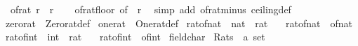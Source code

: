 \begin{isabellebody}
\ \ {\isachardoublequoteopen}{\isasymlceil}of{\isacharunderscore}{\kern0pt}rat\ r{\isasymrceil}\ {\isacharequal}{\kern0pt}\ {\isasymlceil}r{\isasymrceil}{\isachardoublequoteclose}\isanewline
%
\isadelimproof
\ \ %
\endisadelimproof
%
\isatagproof
{}\isamarkupfalse%
\ of{\isacharunderscore}{\kern0pt}rat{\isacharunderscore}{\kern0pt}floor\ {\isacharbrackleft}{\kern0pt}of\ {\isachardoublequoteopen}{\isacharminus}{\kern0pt}\ r{\isachardoublequoteclose}{\isacharbrackright}{\kern0pt}\ \isamarkupfalse%
\ {\isacharparenleft}{\kern0pt}simp\ add{\isacharcolon}{\kern0pt}\ of{\isacharunderscore}{\kern0pt}rat{\isacharunderscore}{\kern0pt}minus\ ceiling{\isacharunderscore}{\kern0pt}def{\isacharparenright}{\kern0pt}%
\endisatagproof
{\isafoldproof}%
%
\isadelimproof
\isanewline
%
\endisadelimproof
\isanewline
{}\isamarkupfalse%
\ zero{\isacharunderscore}{\kern0pt}rat\ {\isacharequal}{\kern0pt}\ Zero{\isacharunderscore}{\kern0pt}rat{\isacharunderscore}{\kern0pt}def\isanewline
{}\isamarkupfalse%
\ one{\isacharunderscore}{\kern0pt}rat\ {\isacharequal}{\kern0pt}\ One{\isacharunderscore}{\kern0pt}rat{\isacharunderscore}{\kern0pt}def\isanewline
\isanewline
{}\isamarkupfalse%
\ rat{\isacharunderscore}{\kern0pt}of{\isacharunderscore}{\kern0pt}nat\ {\isacharcolon}{\kern0pt}{\isacharcolon}{\kern0pt}\ {\isachardoublequoteopen}nat\ {\isasymRightarrow}\ rat{\isachardoublequoteclose}\isanewline
\ \ \ {\isachardoublequoteopen}rat{\isacharunderscore}{\kern0pt}of{\isacharunderscore}{\kern0pt}nat\ {\isasymequiv}\ of{\isacharunderscore}{\kern0pt}nat{\isachardoublequoteclose}\isanewline
\isanewline
{}\isamarkupfalse%
\ rat{\isacharunderscore}{\kern0pt}of{\isacharunderscore}{\kern0pt}int\ {\isacharcolon}{\kern0pt}{\isacharcolon}{\kern0pt}\ {\isachardoublequoteopen}int\ {\isasymRightarrow}\ rat{\isachardoublequoteclose}\isanewline
\ \ \ {\isachardoublequoteopen}rat{\isacharunderscore}{\kern0pt}of{\isacharunderscore}{\kern0pt}int\ {\isasymequiv}\ of{\isacharunderscore}{\kern0pt}int{\isachardoublequoteclose}%
\isadelimdocument
%
\endisadelimdocument
%
\isatagdocument
%
\isamarkuptrue%
%
\endisatagdocument
{\isafolddocument}%
%
\isadelimdocument
%
\endisadelimdocument
{}\isamarkupfalse%
\ field{\isacharunderscore}{\kern0pt}char{\isacharunderscore}{\kern0pt}{}\isanewline
{}\isanewline
\isanewline
{}\isamarkupfalse%
\ Rats\ {\isacharcolon}{\kern0pt}{\isacharcolon}{\kern0pt}\ {\isachardoublequoteopen}{\isacharprime}{\kern0pt}a\ set{\isachardoublequoteclose}\ {\isacharparenleft}{\kern0pt}{\isachardoublequoteopen}{\isasymrat}{\isachardoublequoteclose}{\isacharparenright}{\kern0pt}\isanewline

\end{isabellebody}

